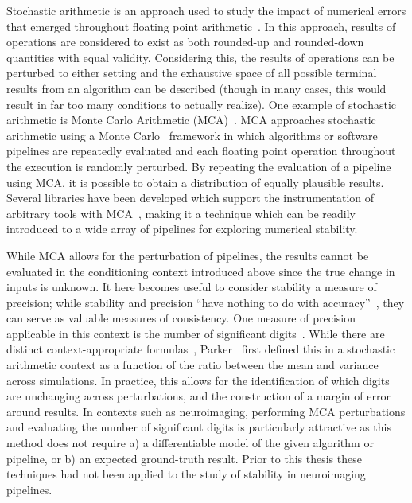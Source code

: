 Stochastic arithmetic is an approach used to study the impact of numerical errors that emerged throughout floating
point arithmetic~\cite{vignes1993stochastic,connolly2020stochastic}. In this approach, results of operations are
considered to exist as both rounded-up and rounded-down quantities with equal validity. Considering this, the results
of operations can be perturbed to either setting and the exhaustive space of all possible terminal results from an
algorithm can be described (though in many cases, this would result in far too many conditions to actually realize).
One example of stochastic arithmetic is Monte Carlo Arithmetic (MCA)~\cite{Parker1997-qq}. MCA approaches stochastic
arithmetic using a Monte Carlo~\cite{metropolis1949monte} framework in which algorithms or software pipelines are
repeatedly evaluated and each floating point operation throughout the execution is randomly perturbed. By repeating the
evaluation of a pipeline using MCA, it is possible to obtain a distribution of equally plausible results. Several
libraries have been developed which support the instrumentation of arbitrary tools with
MCA~\cite{frechtling2015mcalib,Denis2016-wo}, making it a technique which can be readily introduced to a wide array of
pipelines for exploring numerical stability.

While MCA allows for the perturbation of pipelines, the results cannot be evaluated in the conditioning context
introduced above since the true change in inputs is unknown. It here becomes useful to consider stability a measure of
precision; while stability and precision ``have nothing to do with accuracy''~\cite{kiusalaas2013numerical}, they can
serve as valuable measures of consistency. One measure of precision applicable in this context is the number of
significant digits~\cite{Parker1997-qq}. While there are distinct context-appropriate
formulas~\cite{sohier2018confidence}, Parker~\cite{Parker1997-qq} first defined this in a stochastic arithmetic context
as a function of the ratio between the mean and variance across simulations. In practice, this allows for the
identification of which digits are unchanging across perturbations, and the construction of a margin of error around
results. In contexts such as neuroimaging, performing MCA perturbations and evaluating the number of significant digits
is particularly attractive as this method does not require a) a differentiable model of the given algorithm or pipeline,
or b) an expected ground-truth result. Prior to this thesis these techniques had not been applied to the study of
stability in neuroimaging pipelines.


